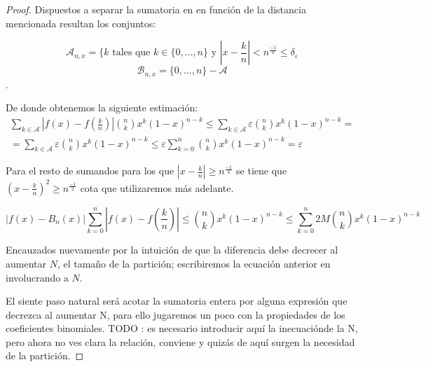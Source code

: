 \begin{proof}
    Dispuestos a separar la sumatoria en en función de la  distancia mencionada resultan los conjuntos: 

     $$\mathcal{A}_{n,x} = \{ k \text{ tales que } k \in \{0,..., n\} \text{ y  } |x - \frac{k}{n}| < n^{\frac{-1}{4}} \leq \delta_\varepsilon$$
     $$\mathcal{B}_{n,x} = \{0,..., n\} - \mathcal{A}$$. 

     De donde obtenemos la siguiente estimación: 
     \begin{equation*}
        \begin{split}
        \sum_{k \in \mathcal A } \left|f(x) - f \left( \frac{k}{n} \right)\right|
     \binom{n}{k} x^{k} (1-x)^{n-k}
     \leq 
     \sum_{k \in \mathcal A } \varepsilon \binom{n}{k} x^{k} (1-x)^{n-k} 
     =  \\
      = \sum_{k \in \mathcal A } \varepsilon \binom{n}{k} x^{k} (1-x)^{n-k} 
     \leq 
     \varepsilon \sum_{k = 0} ^ n  \binom{n}{k} x^{k} (1-x)^{n-k} = 
     \varepsilon
        \end{split}
    \end{equation*}

    Para el resto de sumandos para los que $|x - \frac{k}{n}| \geq  n^{\frac{-1}{4}}$ se tiene que 
    $(x - \frac{k}{n})^2 \geq  n^{\frac{-1}{2}}$ cota que utilizaremos más adelante. 

    \begin{equation*}
        |f(x)-B_n(x)| \sum_{k=0}^n \left|f(x) - f \left( \frac{k}{n} \right)\right| \leq
     \binom{n}{k} x^{k} (1-x)^{n-k}
     \leq \sum_{k=0}^n 2M 
    \binom{n}{k} x^{k} (1-x)^{n-k}
    \end{equation*}


    Encauzados nuevamente por la intuición de que la diferencia debe decrecer al aumentar $N$,
     el tamaño de la partición;
    escribiremos la ecuación anterior en involucrando a $N$. 



    El siente paso natural será acotar la sumatoria entera por alguna expresión que decrezca al aumentar N, para ello jugaremos un poco con la propiedades de los coeficientes binomiales. 
    TODO : es necesario introducir aquí la inecuaciónde la N, pero ahora no ves clara la relación, conviene 
    y quizás de aquí surgen la necesidad de la partición. 
   


\end{proof}
